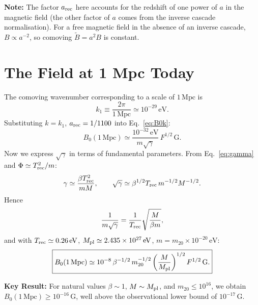 \documentclass[12pt,a4paper,openany]{book}
\newcommand{\Mpl}{M_{\rm pl}}
\begin{document}
\medskip
\noindent\textbf{Note:} The factor $a_{\rm rec}$ here accounts for the redshift of one power of $a$ in the magnetic field (the other factor of $a$ comes from the inverse cascade normalisation). For a free magnetic field in the absence of an inverse cascade, $B \propto a^{-2}$, so comoving $\tilde{B} = a^2 B$ is constant.

\section{The Field at 1 Mpc Today}

The comoving wavenumber corresponding to a scale of $1\,\mathrm{Mpc}$ is
\begin{equation}
  k_1 \equiv \frac{2\pi}{1\,\mathrm{Mpc}} \simeq 10^{-29}\,\mathrm{eV}.
\end{equation}
Substituting $k = k_1$, $a_{\rm rec} = 1/1100$ into Eq.~\eqref{eq:B0k}:
\begin{equation}
  B_0(1\,\mathrm{Mpc}) \simeq \frac{10^{-32}\,\mathrm{eV}}{m\sqrt{\gamma}}\,F^{1/2}\,\mathrm{G}.
  \label{eq:B01Mpc}
\end{equation}
Now we express $\sqrt{\gamma}$ in terms of fundamental parameters. From Eq.~\eqref{eq:gamma} and $\Phi \simeq T_{\rm rec}^2/m$:
\begin{equation}
  \gamma \simeq \frac{\beta T_{\rm rec}^2}{mM}, \qquad \sqrt{\gamma} \simeq \beta^{1/2}T_{\rm rec}\,m^{-1/2}M^{-1/2}.
\end{equation}
Hence
\begin{equation}
  \frac{1}{m\sqrt{\gamma}} = \frac{1}{T_{\rm rec}}\sqrt{\frac{M}{\beta m}},
\end{equation}
and with $T_{\rm rec} \simeq 0.26\,\mathrm{eV}$, $\Mpl \simeq 2.435\times10^{27}\,\mathrm{eV}$, $m = m_{20}\times10^{-20}\,\mathrm{eV}$:
\begin{equation}
  \boxed{B_0(1\,\mathrm{Mpc}) \simeq 10^{-8}\,\beta^{-1/2}\,m_{20}^{-1/2}\left(\frac{M}{\Mpl}\right)^{1/2}F^{1/2}\,\mathrm{G}.}
  \label{eq:finalB}
\end{equation}

\medskip
\noindent\textbf{Key Result:} For natural values $\beta \sim 1$, $M \sim \Mpl$, and $m_{20} \leq 10^{16}$, we obtain $B_0(1\,\mathrm{Mpc}) \geq 10^{-16}\,\mathrm{G}$, well above the observational lower bound of $10^{-17}\,\mathrm{G}$.

\end{document}
